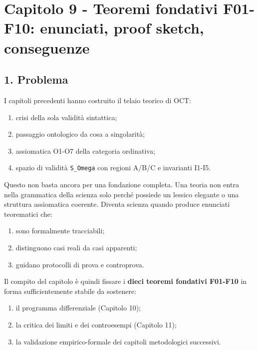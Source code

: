\chapter{Capitolo 9 - Teoremi fondativi F01-F10: enunciati, proof sketch, conseguenze}

\section{1. Problema}

I capitoli precedenti hanno costruito il telaio teorico di OCT:

\begin{enumerate}
\def\labelenumi{\arabic{enumi}.}
\tightlist
\item
  crisi della sola validità sintattica;
\item
  passaggio ontologico da cosa a singolarità;
\item
  assiomatica O1-O7 della categoria ordinativa;
\item
  spazio di validità \texttt{S\_Omega} con regioni A/B/C e invarianti I1-I5.
\end{enumerate}

Questo non basta ancora per una fondazione completa. Una teoria non entra nella grammatica della scienza solo perché possiede un lessico elegante o una struttura assiomatica coerente. Diventa scienza quando produce enunciati teorematici che:

\begin{enumerate}
\def\labelenumi{\arabic{enumi}.}
\tightlist
\item
  sono formalmente tracciabili;
\item
  distinguono casi reali da casi apparenti;
\item
  guidano protocolli di prova e controprova.
\end{enumerate}

Il compito del capitolo è quindi fissare i \textbf{dieci teoremi fondativi F01-F10} in forma sufficientemente stabile da sostenere:

\begin{enumerate}
\def\labelenumi{\arabic{enumi}.}
\tightlist
\item
  il programma differenziale (Capitolo 10);
\item
  la critica dei limiti e dei controesempi (Capitolo 11);
\item
  la validazione empirico-formale dei capitoli metodologici successivi.
\end{enumerate}

